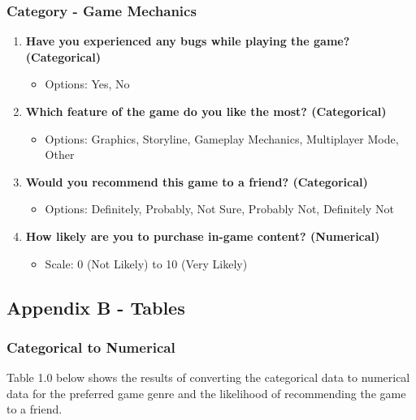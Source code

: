 \documentclass[
  letterpaper,
  DIV=11,
  numbers=noendperiod]{scrartcl}
\providecommand{\tightlist}{%
  \setlength{\itemsep}{0pt}\setlength{\parskip}{0pt}}\usepackage{longtable,booktabs,array}
\begin{document}
\subsubsection{Category - Game
Mechanics}\label{category---game-mechanics}

\begin{enumerate}
\def\labelenumi{\arabic{enumi}.}
\tightlist
\item
  \textbf{Have you experienced any bugs while playing the game?
  (Categorical)}

  \begin{itemize}
  \tightlist
  \item
    Options: Yes, No
  \end{itemize}
\item
  \textbf{Which feature of the game do you like the most? (Categorical)}

  \begin{itemize}
  \tightlist
  \item
    Options: Graphics, Storyline, Gameplay Mechanics, Multiplayer Mode,
    Other
  \end{itemize}
\item
  \textbf{Would you recommend this game to a friend? (Categorical)}

  \begin{itemize}
  \tightlist
  \item
    Options: Definitely, Probably, Not Sure, Probably Not, Definitely
    Not
  \end{itemize}
\item
  \textbf{How likely are you to purchase in-game content? (Numerical)}

  \begin{itemize}
  \tightlist
  \item
    Scale: 0 (Not Likely) to 10 (Very Likely)
  \end{itemize}
\end{enumerate}

\subsection{Appendix B - Tables}\label{appendix-b---tables}

\subsubsection{Categorical to Numerical}\label{categorical-to-numerical}

Table 1.0 below shows the results of converting the categorical data to
numerical data for the preferred game genre and the likelihood of
recommending the game to a friend.
\end{document}
